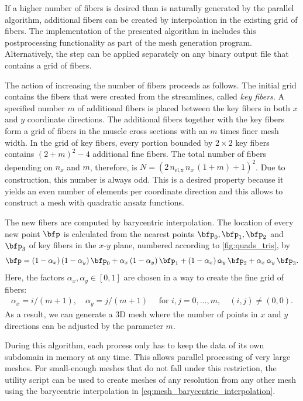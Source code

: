 If a higher number of fibers is desired than is naturally generated by the parallel algorithm, additional fibers can be created by interpolation in the existing grid of fibers. The implementation of the presented algorithm in \opendihu{} includes this postprocessing functionality as part of the mesh generation program. Alternatively, the step can be applied separately on any binary output file that contains a grid of fibers. 

The action of increasing the number of fibers proceeds as follows. The initial grid contains the fibers that were created from the streamlines, called \emph{key fibers}.
A specified number $m$ of additional fibers is placed between the key fibers in both $x$ and $y$ coordinate directions.
The additional fibers together with the key fibers form a grid of fibers in the muscle cross sections with an $m$ times finer mesh width. In the grid of key fibers, every portion bounded by $2 \times 2$ key fibers contains $(2+m)^2 - 4$ additional fine fibers. The total number of fibers depending on $n_x$ and $m$, therefore, is $N=(2\,n_\text{el,x}\,n_x\,(1+m)+1)^2$. Due to construction, this number is always odd. This is a desired property because it yields an even number of elements per coordinate direction and this allows to construct a mesh with quadratic ansatz functions.

The new fibers are computed by barycentric interpolation. The location of every new point $\bfp$ is calculated from the nearest points $\bfp_0, \bfp_1, \bfp_2$ and $\bfp_3$ of key fibers in the $x$-$y$ plane, numbered according to  \cref{fig:quads_tris}, by%
\begin{align}\label{eq:mesh_barycentric_interpolation}
  \bfp = (1-\alpha_x)\,(1-\alpha_y)\,\bfp_0 + \alpha_x\,(1-\alpha_y)\,\bfp_1 
        + (1-\alpha_x)\,\alpha_y\,\bfp_2 + \alpha_x\,\alpha_y\,\bfp_3.
\end{align}
Here, the factors $\alpha_x,\alpha_y \in [0,1]$ are chosen in a way to create the fine grid of fibers:
%
\begin{align*}
  \alpha_x = i / (m+1), \quad \alpha_y = j / (m+1)\quad \text{ for }i,j = 0, \dots,m, \quad (i,j) \neq (0,0).
\end{align*}
As a result, we can generate a 3D mesh where the number of points in $x$ and $y$ directions can be adjusted by the parameter $m$. 

During this algorithm, each process only has to keep the data of its own subdomain in memory at any time. This allows parallel processing of very large meshes. For small-enough meshes that do not fall under this restriction, the utility script  can be used to create meshes of any resolution from any other mesh using the barycentric interpolation in \cref{eq:mesh_barycentric_interpolation}.

